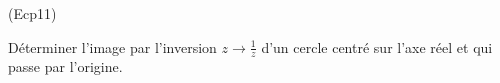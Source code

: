 \begin{tiny}(Ecp11)\end{tiny}
D{\'e}terminer l'image par l'inversion $z\rightarrow \frac{1}{z}$
d'un cercle centr{\'e} sur l'axe r{\'e}el et qui passe par
l'origine.